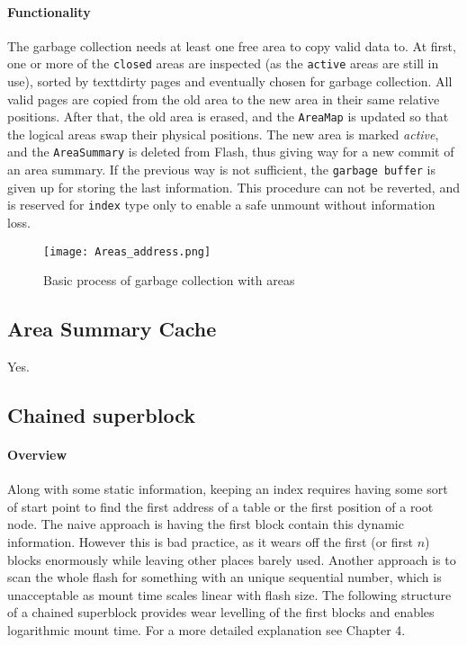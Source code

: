 \paragraph{Functionality}
The garbage collection needs at least one free area to copy valid data to. At first, one or more of the \texttt{closed} areas are inspected (as the \texttt{active} areas are still in use), sorted by textt{dirty} pages and eventually chosen for garbage collection. All valid pages are copied from the old area to the new area in their same relative positions. After that, the old area is erased, and the \texttt{AreaMap} is updated so that the logical areas swap their physical positions. The new area is marked \textit{active}, and the \texttt{AreaSummary} is deleted from Flash, thus giving way for a new commit of an area summary. If the previous way is not sufficient, the \texttt{garbage buffer} is given up for storing the last information. This procedure can not be reverted, and is reserved for \texttt{index} type only to enable a safe unmount without information loss.
\begin{figure}[ht]
  \centering\texttt{[image: Areas\_address.png]}
  \caption{Basic process of garbage collection with areas}
  \label{fig:area_address}
\end{figure}

\subsection{Area Summary Cache}
\label{ascache}
Yes.

\subsection{Chained superblock}
\label{sub:chainedSB}
\paragraph{Overview}
Along with some static information, keeping an index requires having some sort of start point to find the first address of a table or the first position of a root node. The naive approach is having the first block contain this dynamic information. However this is bad practice, as it wears off the first (or first $n$) blocks enormously while leaving other places barely used. Another approach is to scan the whole flash for something with an unique sequential number, which is unacceptable as mount time scales linear with flash size.
The following structure of a chained superblock provides wear levelling of the first blocks and enables logarithmic mount time.
For a more detailed explanation see  Chapter 4.

